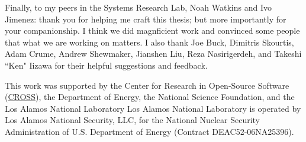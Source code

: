\begin{frontmatter}
\begin{acknowledgements}
Finally, to my peers in the Systems Research Lab, Noah Watkins and Ivo Jimenez:
thank you for helping me craft this thesis; but more importantly for your
companionship. I think we did magnficient work and convinced some people that
what we are working on matters.  I also thank Joe Buck, Dimitris Skourtis, Adam
Crume, Andrew Shewmaker, Jianshen Liu, Reza Nasirigerdeh, and Takeshi ``Ken"
Iizawa for their helpful suggestions and feedback.

This work was supported by the Center for Research in Open-Source Software
(\href{www.cross.soe.ucsc.edu}{CROSS}), the Department of Energy, the National
Science Foundation, and the Los Alamos National Laboratory Los Alamos National
Laboratory is operated by Los Alamos National Security, LLC, for the National
Nuclear Security Administration of U.S. Department of Energy (Contract
DEAC52-06NA25396).

	\end{acknowledgements}
\end{frontmatter}
